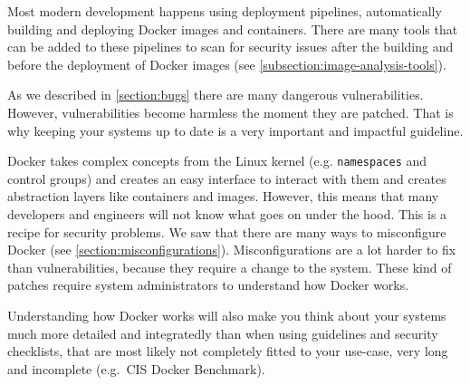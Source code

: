 \medskip

Most modern development happens using deployment pipelines, automatically building and deploying Docker images and containers. There are many tools that can be added to these pipelines to scan for security issues after the building and before the deployment of Docker images (see \autoref{subsection:image-analysis-tools}).

\medskip

As we described in \autoref{section:bugs} there are many dangerous vulnerabilities. However, vulnerabilities become harmless the moment they are patched. That is why keeping your systems up to date is a very important and impactful guideline.

\medskip

Docker takes complex concepts from the Linux kernel (e.g. \lstinline{namespaces} and control groups) and creates an easy interface to interact with them and creates abstraction layers like containers and images. However, this means that many developers and engineers will not know what goes on under the hood. This is a recipe for security problems. We saw that there are many ways to misconfigure Docker (see \autoref{section:misconfigurations}). Misconfigurations are a lot harder to fix than vulnerabilities, because they require a change to the system. These kind of patches require system administrators to understand how Docker works.


Understanding how Docker works will also make you think about your systems much more detailed and integratedly than when using guidelines and security checklists, that are most likely not completely fitted to your use-case, very long and incomplete (e.g.\ CIS Docker Benchmark).
